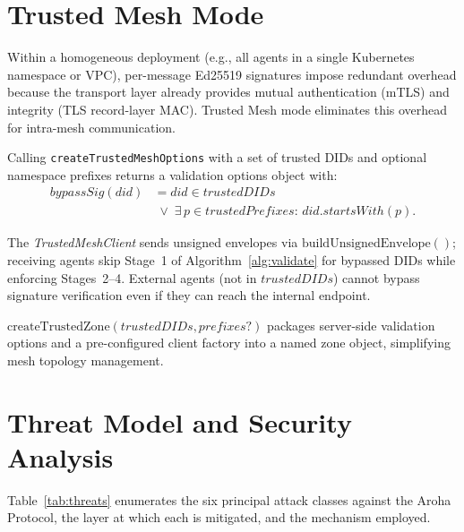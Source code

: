 \documentclass[conference]{IEEEtran}
\begin{document}
\section{Trusted Mesh Mode}
\label{sec:mesh}

Within a homogeneous deployment (e.g., all agents in a single
Kubernetes namespace or VPC), per-message Ed25519 signatures
impose redundant overhead because the transport layer already
provides mutual authentication (mTLS) and integrity (TLS
record-layer MAC). Trusted Mesh mode eliminates this overhead
for intra-mesh communication.

Calling \texttt{createTrustedMeshOptions} with a set of
trusted DIDs and optional namespace prefixes returns a
validation options object
with:
{\small\begin{align*}
  \mathit{bypassSig}(\mathit{did}) &=
    \mathit{did} \in \mathit{trustedDIDs} \\
    &\;\lor\;
    \exists\, p \in \mathit{trustedPrefixes}:\,
      \mathit{did.startsWith}(p).
\end{align*}}

The \textit{TrustedMeshClient} sends unsigned envelopes via
$\mathrm{buildUnsignedEnvelope}()$; receiving agents skip Stage~1
of Algorithm~\ref{alg:validate} for bypassed DIDs while
enforcing Stages~2--4. External agents (not in
$\mathit{trustedDIDs}$) cannot bypass signature verification
even if they can reach the internal endpoint.

$\mathrm{createTrustedZone}(\mathit{trustedDIDs},
\mathit{prefixes?})$ packages server-side validation options and
a pre-configured client factory into a named zone object,
simplifying mesh topology management.

\section{Threat Model and Security Analysis}
\label{sec:security}

Table~\ref{tab:threats} enumerates the six principal attack
classes against the Aroha Protocol, the layer at which each is
mitigated, and the mechanism employed.
\end{document}
